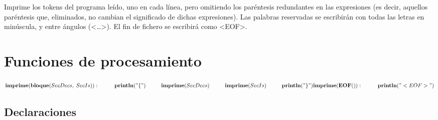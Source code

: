 Imprime los tokens del programa leído, uno en cada línea, pero omitiendo los paréntesis redundantes en las expresiones 
(es decir, aquellos paréntesis que, eliminados, no cambian el significado de dichas expresiones). 
Las palabras reservadas se escribirán con todas las letras en minúscula, y entre ángulos (<…>). 
El fin de fichero se escribirá como <EOF>.

\section{Funciones de procesamiento}

\begin{math}
    \textbf{imprime}(\textbf{bloque}(SecDecs, \; SecIs)): \\
        \phantom{---} \textbf{println}("\{") \\
        \phantom{---} \textbf{imprime}(SecDecs) \\
        \phantom{---} \textbf{imprime}(SecIs) \\
        \phantom{---} \textbf{println}("\}") \\
    \\
    \textbf{imprime}(\textbf{EOF}()): \\
        \phantom{---} \textbf{println}("<EOF>")
\end{math}

\subsection{Declaraciones}

